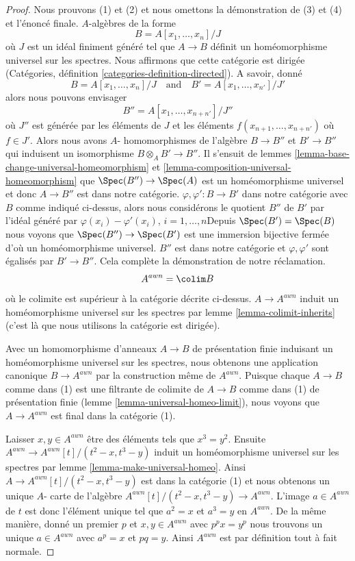 \begin{proof}

Nous prouvons (1) et (2) et nous omettons la démonstration de (3) et (4) et l'énoncé finale. $A$-algèbres de la forme
$$
B = A[x_1, \ldots, x_n]/J
$$
où $J$ est un idéal finiment généré tel que $A \to B$ définit un homéomorphisme universel sur les spectres. Nous affirmons que cette catégorie est dirigée (Catégories, définition \ref{categories-definition-directed}). A savoir, donné
$$
B = A[x_1, \ldots, x_n]/J
\quad\text{and}\quad
B' = A[x_1, \ldots, x_{n'}]/J'
$$
alors nous pouvons envisager
$$
B'' = A[x_1, \ldots, x_{n + n'}]/J''
$$
où $J''$ est générée par les éléments de $J$ et les éléments
$f(x_{n + 1}, \ldots, x_{n + n'})$ où $f \in J'$. Alors nous avons $A$- homomorphismes de l'algèbre $B \to B''$ et $B' \to B''$
qui induisent un isomorphisme $B \otimes_A B' \to B''$. Il s'ensuit de lemmes \ref{lemma-base-change-universal-homeomorphism} et
\ref{lemma-composition-universal-homeomorphism}
que $\Spec(B'') \to \Spec(A)$ est un homéomorphisme universel et donc $A \to B''$ est dans notre catégorie. $\varphi, \varphi' : B \to B'$
dans notre catégorie avec $B$ comme indiqué ci-dessus, alors nous considérons le quotient $B''$ de $B'$
par l'idéal généré par $\varphi(x_i) - \varphi'(x_i)$, $i = 1, \ldots, n$Depuis $\Spec(B') = \Spec(B)$ nous voyons que $\Spec(B'') \to \Spec(B')$
est une immersion bijective fermée d'où un homéomorphisme universel. $B''$ est dans notre catégorie et $\varphi, \varphi'$ sont égalisés par $B' \to B''$. Cela complète la démonstration de notre réclamation.
$$
A^{awn} = \colim B
$$
où le colimite est supérieur à la catégorie décrite ci-dessus.
$A \to A^{awn}$ induit un homéomorphisme universel sur les spectres par lemme \ref{lemma-colimit-inherits} (c'est là que nous utilisons la catégorie est dirigée).

\medskip\noindent
Avec un homomorphisme d'anneaux $A \to B$ de présentation finie induisant un homéomorphisme universel sur les spectres, nous obtenons une application canonique $B \to A^{awn}$ par la construction même de $A^{awn}$. Puisque chaque $A \to B$ comme dans (1) est une filtrante de colimite de $A \to B$ comme dans (1) de présentation finie (lemme \ref{lemma-universal-homeo-limit}), nous voyons que $A \to A^{awn}$ est final dans la catégorie (1).

\medskip\noindent

Laisser $x, y \in A^{awn}$ être des éléments tels que $x^3 = y^2$. Ensuite $A^{awn} \to A^{awn}[t]/(t^2 - x, t^3 - y)$ induit un homéomorphisme universel sur les spectres par lemme \ref{lemma-make-universal-homeo}. Ainsi $A \to A^{awn}[t]/(t^2 - x, t^3 - y)$ est dans la catégorie (1) et nous obtenons un unique $A$- carte de l'algèbre
$A^{awn}[t]/(t^2 - x, t^3 - y) \to A^{awn}$. L'image $a \in A^{awn}$ de $t$ est donc l'élément unique tel que $a^2 = x$ et $a^3 = y$ en $A^{awn}$. De la même manière, donné un premier $p$ et $x, y \in A^{awn}$
avec $p^px = y^p$ nous trouvons un unique $a \in A^{awn}$ avec
$a^p = x$ et $pq = y$. Ainsi $A^{awn}$ est par définition tout à fait normale.


\end{proof}
